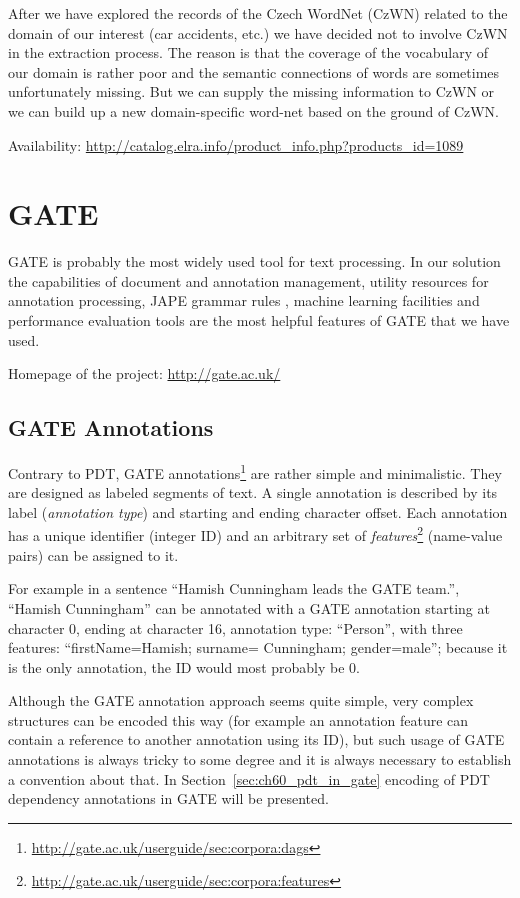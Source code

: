 After we have explored the records of the Czech WordNet (CzWN) related to the domain of our interest (car accidents, etc.) we have decided not to involve CzWN in the extraction process. The reason is that the coverage of the vocabulary of our domain is rather poor and the semantic connections of words are sometimes unfortunately missing. But we can supply the missing information to CzWN or we can build up a new domain-specific word-net based on the ground of CzWN.  

\medskip
Availability: \url{http://catalog.elra.info/product_info.php?products_id=1089}



\section{GATE} \label{sec:ch30_gate}
GATE \citep{biblio:GATE_ACL2002} is probably the most widely used tool for text processing. In our solution the capabilities of document and annotation management, utility resources for annotation processing, JAPE grammar rules \citep{Cunningham00jape:a}, machine learning facilities and performance evaluation tools are the most helpful features of GATE that we have used.

\medskip
Homepage of the project: \url{http://gate.ac.uk/}

\subsection{GATE Annotations} \label{sec:ch30_gate_annotations}
Contrary to PDT, GATE annotations\footnote{\url{http://gate.ac.uk/userguide/sec:corpora:dags}} are rather simple and minimalistic. They are designed as labeled segments of text. A single annotation is described by its label (\emph{annotation type}) and starting and ending character offset. Each annotation has a unique identifier (integer ID) and an arbitrary set of \emph{features}\footnote{\url{http://gate.ac.uk/userguide/sec:corpora:features}} (name-value pairs) can be assigned to it. 

For example in a sentence ``Hamish Cunningham leads the GATE team.'', ``Hamish Cunningham'' can be annotated with a GATE annotation starting at character 0, ending at character 16, annotation type: ``Person'', with three features: ``firstName=Hamish; surname= Cunningham; gender=male''; because it is the only annotation, the ID would most probably be 0.

Although the GATE annotation approach seems quite simple, very complex structures can be encoded this way (for example an annotation feature can contain a reference to another annotation using its ID), but such usage of GATE annotations is always tricky to some degree and it is always necessary to establish a convention about that. In Section~\ref{sec:ch60_pdt_in_gate} encoding of PDT dependency annotations in GATE will be presented.


